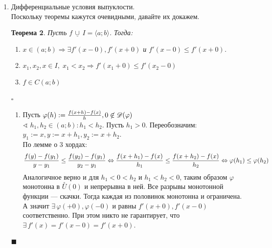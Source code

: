 \documentclass[a4paper,12pt]{article}
\newcommand\R{\mathbb{R}}
\newcommand\convex{\,\underline\cup\,}
\theoremstyle{plain}
\newtheorem{thrm}{Теорема}
\theoremstyle{definition}
\theoremstyle{remark}
\newenvironment{ittproof}{$\square$ }{ $\blacksquare$ \\}
\def\resetdefs{ \setcounter{defn}{0}\setcounter{exmp}{0} }
\def\resetthrm{ \setcounter{thrm}{0}\setcounter{stat}{0} }
\def\resetrem{ \setcounter{rem}{0} }
\def\resetall{ \resetdefs \resetthrm \resetrem}
\begin{document}
\begin{enumerate}
    \begin{thrm}[Неравенство Енсена] \label{thrm:jensen}
      Пусть $f : I \to \R,\; f \convex I$. Тогда :
      \begin{align*}
        &\forall\,x_1,\ldots,x_n \in I,\; \forall\,\lambda_1,\dots,\lambda_n \in [0:1] 
                                          : \sum_{i=1}^n\lambda_i = 1 \quad
        f\left(\sum_{i=1}^n\lambda_ix_i\right) \leq \sum_{i=1}^n\lambda_if(x_i)
      \end{align*}
    \end{thrm} Индукцией побеждается
  \item Дифференциальные условия выпуклости.\\
    \resetall
    Поскольку теоремы кажутся очевидными, давайте их докажем.
    \begin{thrm} \label{thrm:derconvex} 
      Пусть $f \convex I=\langle a; b \rangle $. 
      Тогда: 
      \begin{enumerate}
        \item $x \in (a;b) \Rightarrow \exists f'(x-0), f'(x+0)$ и $f'(x-0) \leq f'(x+0)$.
        \item $x_1,x_2,x \in I,\;x_1<x_2 \Rightarrow f'(x_1+0) \leq f'(x_2-0)$
        \item $f\in C(a;b)$
      \end{enumerate}
    \end{thrm}
    \begin{ittproof}
      \begin{enumerate}
        \item Пусть $\varphi(h) := {f(x+h) - f(x) \over h}, 0\not\in \mathscr{D}(\varphi)$ \\
          $ \sphericalangle\; h_1, h_2 \in (a;b): h_1 < h_2 $.
          Пусть $ h_1 > 0 $.
          Переобозначим: $ y_1 := x, y := x + h_1, y_2 := x + h_2 $.\\
          По лемме о 3 хордах:
          \[
            {f(y)-f(y_1) \over y-y_1} \leq {f(y_2)-f(y_1) \over y_2-y_1}\Leftrightarrow
            {f(x+h_1) - f(x) \over h_1} \leq {f(x+h_2)-f(x) \over h_2}\Leftrightarrow
            \varphi(h_1) \leq \varphi(h_2)
          \]
          Аналогичное верно и для $h_1 < 0 < h_2$ и $h_1 < h_2 < 0$, таким образом
          $\varphi$ монотонна в $\overset{\circ}{U}(0)$ и непрерывна в ней. Все разрывы
          монотонной функции --- скачки. Тогда каждая из половинок монотонна и ограничена.
          А значит $\exists\, \varphi(+0), \varphi(-0)$ и равны $f'(x+0), f'(x-0)$ соответственно.
          При этом никто не гарантирует, что $\exists\, f'(x) = f'(x-0) = f'(x+0)$.

\end{enumerate}
\end{ittproof}
\end{enumerate}
\end{document}
